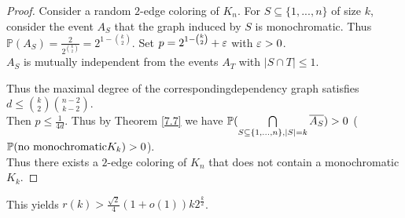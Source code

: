 \begin{proof}
    Consider a random $2$-edge coloring of $K_n$. For $S\subseteq\{1,...,n\}$ of size $k$, consider the event $A_S$ that the graph induced by $S$ is monochromatic. Thus $\mathbb{P}(A_S)=\frac{2}{2^{\binom{k}{2}}}=2^{1-\binom{k}{2}}$. Set $p=2^{1-\binom{k}{2}}+\varepsilon$ with $\varepsilon>0$.\\
    $A_S$ is mutually independent from the events $A_T$ with $|S\cap T|\leq 1$.
    \begin{center}
    \end{center}

    Thus the maximal degree of the correspondingdependency graph satisfies $d\leq \binom{k}{2}\binom{n-2}{k-2}$.\\
    Then $p\leq \frac{1}{4d}$. Thus by Theorem \ref{7.7} we have $\mathbb{P}(\bigcap\limits_{S\subseteq\{1,...,n\},|S|=k} \overline{A_S})>0$ ($\mathbb{P}(\text{no monochromatic} K_k)>0$).\\
    Thus there exists a $2$-edge coloring of $K_n$ that does not contain a monochromatic $K_k$.
\end{proof}
\begin{remark}\label{7.10}
    This yields $r(k)>\frac{\sqrt{2}}{4}(1+o(1))k2^{\frac{k}{2}}$.
\end{remark}